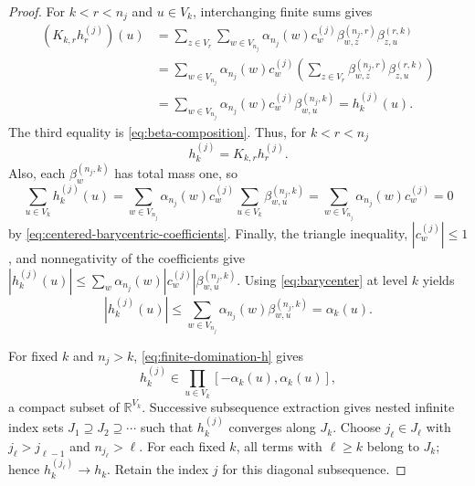 \documentclass[11pt]{amsart}
\theoremstyle{definition}
\theoremstyle{remark}
\begin{document}
\begin{proof}
For $k<r<n_j$ and $u\in V_k$, interchanging finite sums gives
\[
 \begin{aligned}
 (K_{k,r}h_r^{(j)})(u)
 &=\sum_{z\in V_r}\sum_{w\in V_{n_j}}
   \alpha_{n_j}(w)c_w^{(j)}\beta_{w,z}^{(n_j,r)}
   \beta_{z,u}^{(r,k)}\\
 &=\sum_{w\in V_{n_j}}\alpha_{n_j}(w)c_w^{(j)}
   \left(\sum_{z\in V_r}\beta_{w,z}^{(n_j,r)}\beta_{z,u}^{(r,k)}\right)\\
 &=\sum_{w\in V_{n_j}}\alpha_{n_j}(w)c_w^{(j)}\beta_{w,u}^{(n_j,k)}
 =h_k^{(j)}(u).
 \end{aligned}
\]
The third equality is \eqref{eq:beta-composition}.
Thus, for \(k<r<n_j\)
\begin{equation}\label{eq:finite-coherence-h}
 h_k^{(j)}=K_{k,r}h_r^{(j)}.
\end{equation}
Also, each $\beta_w^{(n_j,k)}$ has total mass one, so
\[
 \sum_{u\in V_k}h_k^{(j)}(u)
 =\sum_{w\in V_{n_j}}\alpha_{n_j}(w)c_w^{(j)}
       \sum_{u\in V_k}\beta_{w,u}^{(n_j,k)}
 =\sum_{w\in V_{n_j}}\alpha_{n_j}(w)c_w^{(j)}=0
\]
by \eqref{eq:centered-barycentric-coefficients}.
Finally, the triangle inequality, $|c_w^{(j)}|\leq1$, and nonnegativity of
the coefficients give
$|h_k^{(j)}(u)|\leq\sum_w\alpha_{n_j}(w)|c_w^{(j)}|\beta_{w,u}^{(n_j,k)}$.
Using \eqref{eq:barycenter} at level $k$ yields
\begin{equation}\label{eq:finite-domination-h}
 |h_k^{(j)}(u)|\leq\sum_{w\in V_{n_j}}
       \alpha_{n_j}(w)\beta_{w,u}^{(n_j,k)}=\alpha_k(u).
\end{equation}

For fixed $k$ and $n_j>k$, \eqref{eq:finite-domination-h} gives
\[
 h_k^{(j)}\in\prod_{u\in V_k}[-\alpha_k(u),\alpha_k(u)],
\]
a compact subset of $\mathbb R^{V_k}$.
Successive subsequence extraction gives nested infinite index sets
$J_1\supseteq J_2\supseteq\cdots$ such that $h_k^{(j)}$ converges along
$J_k$.  Choose $j_\ell\in J_\ell$ with $j_\ell>j_{\ell-1}$ and
$n_{j_\ell}>\ell$.  For each fixed $k$, all terms with $\ell\geq k$
belong to $J_k$; hence $h_k^{(j_\ell)}\to h_k$.
Retain the index $j$ for this diagonal subsequence.


\end{proof}
\end{document}
